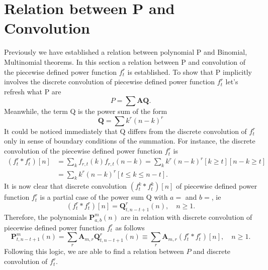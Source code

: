 \documentclass[12pt, letterpaper]{amsart}
\theoremstyle{definition}
\theoremstyle{remark}
\numberwithin{equation}{section}
\begin{document}
\section{Relation between P and Convolution}
Previously we have established a relation between polynomial P and Binomial, Multinomial theorems. In this section a relation between P and convolution of the piecewise defined power function $f_{t}^{r}$ is established. To show that P implicitly involves the discrete convolution of piecewise defined power function $f_{t}^{r}$ let's refresh what P are
\begin{equation*}
P=\sum \mathbf{A Q}.
\end{equation*}
Meanwhile, the term Q is the power sum of the form
\begin{equation*}
\mathbf{Q} = \sum k^r (n-k)^r
\end{equation*}
It could be noticed immediately that Q differs from the discrete convolution of $f_{t}^{r}$ only in sense of boundary conditions of the summation. For instance, the discrete convolution of the piecewise defined power function $f_{t}^{r}$ is
\begin{equation*}
\begin{split}
(f_{t}^{r} \ast f_{t}^{r})[n]
&= \sum_{k}f_{r,t}(k)f_{r,t}(n-k) = \sum_{k}k^r(n-k)^r[k\geq t][n-k\geq t] \\
&= \sum_{k}k^r(n-k)^r[t\leq k \leq n-t].
\end{split}
\end{equation*}
It is now clear that discrete convolution $(f_{t}^{k} \ast f_{t}^{k})[n]$ of piecewise defined power function $f_{t}^{r}$ is a partial case of the power sum Q with $a=$ and $b=$, ie
\begin{equation*}
(f_{t}^{r} \ast f_{t}^{r})[n]  = \mathbf{Q}_{t,n-t+1}^r(n), \quad n\geq 1.
\end{equation*}
Therefore, the polynomials $\mathbf{P}^{m}_{a,b}(n)$ are in relation with discrete convolution of piecewise defined power function $f_{t}^{r}$ as follows
\begin{equation*}
\mathbf{P}^{m}_{t,n-t+1}(n)
=\sum\limits_{r}\mathbf{A}_{m,r} \mathbf{Q}_{t,n-t+1}^r(n)
\equiv \sum\limits_{r}\mathbf{A}_{m,r} (f_{t}^{r} \ast f_{t}^{r})[n], \quad n\geq 1.
\end{equation*}
Following this logic, we are able to find a relation between $P$ and discrete convolution of $f_{t}^{r}$.
\end{document}
